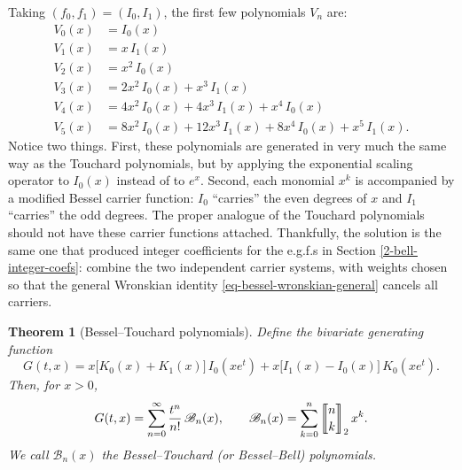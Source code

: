 \documentclass[a4paper]{amsart}
\numberwithin{equation}{section}
\newcommand{\mStirling}[0]{\genfrac{\llbracket}{\rrbracket}{0pt}{}}
\newtheorem{theorem}{Theorem}[section]
\begin{document}
Taking $(f_0, f_1) = (I_0, I_1)$, the first few polynomials $V_n$ are:
\[
\begin{aligned}
V_0(x) &= I_0(x) \\
V_1(x) &= x\,I_1(x) \\
V_2(x) &= x^2\,I_0(x) \\
V_3(x) &= 2x^2\,I_0(x) + x^3\,I_1(x) \\
V_4(x) &= 4x^2\,I_0(x) + 4x^3\,I_1(x) + x^4\,I_0(x) \\
V_5(x) &= 8x^2\,I_0(x) + 12x^3\,I_1(x) + 8x^4\,I_0(x) + x^5\,I_1(x).
\end{aligned}
\]
Notice two things. First, these polynomials are generated in very much the same way as the Touchard polynomials, but by applying the exponential scaling operator to $I_0(x)$ instead of to $e^x$. Second, each monomial $x^k$ is accompanied by a modified Bessel carrier function: $I_0$ ``carries'' the even degrees of $x$ and $I_1$ ``carries'' the odd degrees. The proper analogue of the Touchard polynomials should not have these carrier functions attached. Thankfully, the solution is the same one that produced integer coefficients for the e.g.f.s in Section \ref{2-bell-integer-coefs}: combine the two independent carrier systems, with weights chosen so that the general Wronskian identity \eqref{eq-bessel-wronskian-general} cancels all carriers.

\begin{theorem}[Bessel--Touchard polynomials]\label{thm-bb-polynomials}
Define the bivariate generating function
\[
G(t,x) = x\big[K_0(x)+K_1(x)\big]\, I_0(x e^t) + x\big[I_1(x)-I_0(x)\big]\,K_0(xe^t).
\]
Then, for $x > 0$,
\begin{equation*}
G(t,x) = \sum_{n=0}^\infty \frac{t^n}{n!}\,\mathscr{B}_n(x), \qquad \mathscr{B}_n(x) = \sum_{k=0}^{n}\mStirling{n}{k}_2\, x^k .
\end{equation*}
We call $\mathscr{B}_n(x)$ the Bessel--Touchard (or Bessel--Bell) polynomials.
\end{theorem}
\end{document}
